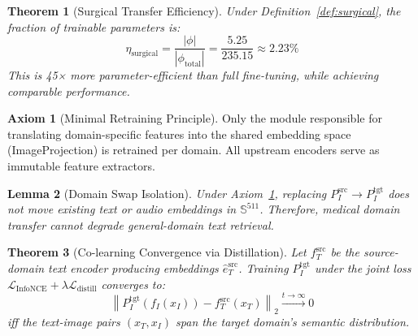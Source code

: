 \documentclass[12pt,a4paper]{article}
\theoremstyle{definition}
\newtheorem{axiom}{Axiom}[section]
\theoremstyle{plain}
\newtheorem{theorem}{Theorem}[section]
\newtheorem{lemma}[theorem]{Lemma}
\theoremstyle{remark}
\newcommand{\Sph}{\mathbb{S}}
\newcommand{\Norm}[1]{\left\|#1\right\|}
\begin{document}
\begin{theorem}[Surgical Transfer Efficiency]
Under Definition~\ref{def:surgical}, the fraction of trainable parameters is:
\[
  \eta_{\text{surgical}} = \frac{|\phi|}{|\phi_{\text{total}}|} = \frac{5.25}{235.15} \approx 2.23\%
\]
This is 45× more parameter-efficient than full fine-tuning, while achieving comparable performance.
\end{theorem}

\begin{axiom}[Minimal Retraining Principle]
\label{ax:minretrain}
Only the module responsible for translating domain-specific features into the shared embedding space (ImageProjection) is retrained per domain. All upstream encoders serve as immutable feature extractors.
\end{axiom}

\begin{lemma}[Domain Swap Isolation]
Under Axiom~\ref{ax:minretrain}, replacing $P_I^{\text{src}} \to P_I^{\text{tgt}}$ does not move existing text or audio embeddings in $\Sph^{511}$. Therefore, medical domain transfer cannot degrade general-domain text retrieval.
\end{lemma}

\begin{theorem}[Co-learning Convergence via Distillation]
Let $f_T^{\text{src}}$ be the source-domain text encoder producing embeddings $\hat{e}_T^{\text{src}}$. Training $P_I^{\text{tgt}}$ under the joint loss $\mathcal{L}_{\text{InfoNCE}} + \lambda\mathcal{L}_{\text{distill}}$ converges to:
\[
  \Norm{P_I^{\text{tgt}}(f_I(x_I)) - f_T^{\text{src}}(x_T)}_2 \xrightarrow{t \to \infty} 0
\]
iff the text-image pairs $(x_T, x_I)$ span the target domain's semantic distribution.
\end{theorem}
\end{document}
